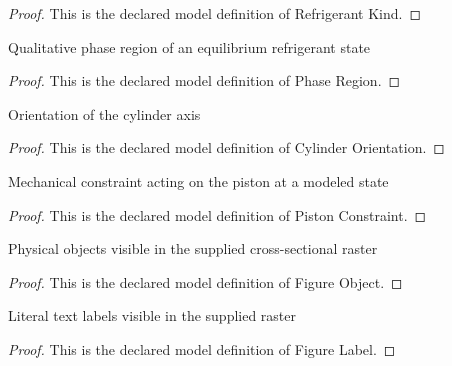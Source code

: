 \begin{proof}
  This is the declared model definition of Refrigerant Kind.
\end{proof}
\begin{definition}
  \label{def:physics:phyx-mini-0464:phyxminiproblems-problemphyxmini0464-phaseregion}
  Qualitative phase region of an equilibrium refrigerant state
\end{definition}
\begin{proof}
  This is the declared model definition of Phase Region.
\end{proof}
\begin{definition}
  \label{def:physics:phyx-mini-0464:phyxminiproblems-problemphyxmini0464-cylinderorientation}
  Orientation of the cylinder axis
\end{definition}
\begin{proof}
  This is the declared model definition of Cylinder Orientation.
\end{proof}
\begin{definition}
  \label{def:physics:phyx-mini-0464:phyxminiproblems-problemphyxmini0464-pistonconstraint}
  Mechanical constraint acting on the piston at a modeled state
\end{definition}
\begin{proof}
  This is the declared model definition of Piston Constraint.
\end{proof}
\begin{definition}
  \label{def:physics:phyx-mini-0464:phyxminiproblems-problemphyxmini0464-figureobject}
  Physical objects visible in the supplied cross-sectional raster
\end{definition}
\begin{proof}
  This is the declared model definition of Figure Object.
\end{proof}
\begin{definition}
  \label{def:physics:phyx-mini-0464:phyxminiproblems-problemphyxmini0464-figurelabel}
  Literal text labels visible in the supplied raster
\end{definition}
\begin{proof}
  This is the declared model definition of Figure Label.
\end{proof}
